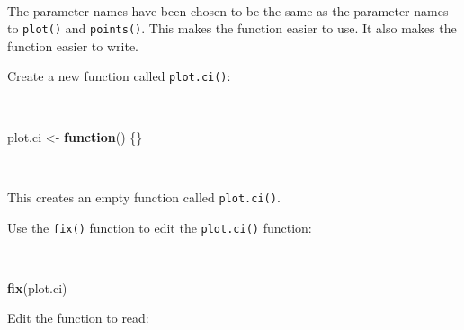 \documentclass[12pt,a4paper]{book}
\newenvironment{Shaded}{\begin{snugshade}}{\end{snugshade}}
\newcommand{\ControlFlowTok}[1]{\textcolor[rgb]{0.13,0.29,0.53}{\textbf{#1}}}
\newcommand{\KeywordTok}[1]{\textcolor[rgb]{0.13,0.29,0.53}{\textbf{#1}}}
\newcommand{\NormalTok}[1]{#1}
\newcommand{\StringTok}[1]{\textcolor[rgb]{0.31,0.60,0.02}{#1}}
\theoremstyle{definition}
\theoremstyle{definition}
\theoremstyle{definition}
\theoremstyle{remark}
\begin{document}
~

The parameter names have been chosen to be the same as the parameter
names to \texttt{plot()} and \texttt{points()}. This makes the function
easier to use. It also makes the function easier to write.

Create a new function called \texttt{plot.ci()}:

~

\begin{Shaded}
\begin{Highlighting}[]
\NormalTok{plot.ci <-}\StringTok{ }\ControlFlowTok{function}\NormalTok{() \{\}}
\end{Highlighting}
\end{Shaded}

~

This creates an empty function called \texttt{plot.ci()}.

Use the \texttt{fix()} function to edit the \texttt{plot.ci()} function:

~

\begin{Shaded}
\begin{Highlighting}[]
\KeywordTok{fix}\NormalTok{(plot.ci)}
\end{Highlighting}
\end{Shaded}

\newpage

Edit the function to read:

~
\end{document}

